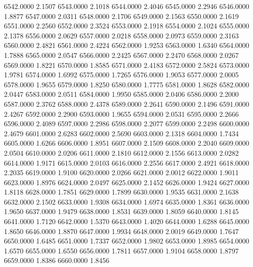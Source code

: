 6542.0000      2.1507
6543.0000      2.1018
6544.0000      2.4046
6545.0000      2.2946
6546.0000      1.8877
6547.0000      2.0311
6548.0000      2.1706
6549.0000      2.1563
6550.0000      2.1619
6551.0000      2.2560
6552.0000      2.3524
6553.0000      2.1918
6554.0000      2.1024
6555.0000      2.1378
6556.0000      2.0629
6557.0000      2.0218
6558.0000      2.0973
6559.0000      2.3163
6560.0000      2.4821
6561.0000      2.4224
6562.0000      1.9253
6563.0000      1.6340
6564.0000      1.7888
6565.0000      2.0547
6566.0000      2.2425
6567.0000      2.2470
6568.0000      2.0267
6569.0000      1.8221
6570.0000      1.8585
6571.0000      2.4183
6572.0000      2.5824
6573.0000      1.9781
6574.0000      1.6992
6575.0000      1.7265
6576.0000      1.9053
6577.0000      2.0005
6578.0000      1.9655
6579.0000      1.8250
6580.0000      1.7775
6581.0000      1.8628
6582.0000      2.0447
6583.0000      2.0511
6584.0000      1.9950
6585.0000      2.0406
6586.0000      2.2000
6587.0000      2.3762
6588.0000      2.4378
6589.0000      2.2641
6590.0000      2.1496
6591.0000      2.4267
6592.0000      2.2900
6593.0000      1.9655
6594.0000      2.0531
6595.0000      2.2666
6596.0000      2.4089
6597.0000      2.2986
6598.0000      2.2077
6599.0000      2.2498
6600.0000      2.4679
6601.0000      2.6283
6602.0000      2.5690
6603.0000      2.1318
6604.0000      1.7434
6605.0000      1.6266
6606.0000      1.8951
6607.0000      2.1509
6608.0000      2.2040
6609.0000      2.0504
6610.0000      2.0206
6611.0000      2.1810
6612.0000      2.1556
6613.0000      2.0282
6614.0000      1.9171
6615.0000      2.0103
6616.0000      2.2556
6617.0000      2.4921
6618.0000      2.2035
6619.0000      1.9100
6620.0000      2.0266
6621.0000      2.0012
6622.0000      1.9011
6623.0000      1.8976
6624.0000      2.0497
6625.0000      2.1452
6626.0000      1.9424
6627.0000      1.8118
6628.0000      1.7851
6629.0000      1.7899
6630.0000      1.9535
6631.0000      2.1638
6632.0000      2.1502
6633.0000      1.9308
6634.0000      1.6974
6635.0000      1.8361
6636.0000      1.9650
6637.0000      1.9479
6638.0000      1.8531
6639.0000      1.8059
6640.0000      1.8145
6641.0000      1.7120
6642.0000      1.5370
6643.0000      1.4020
6644.0000      1.6288
6645.0000      1.8650
6646.0000      1.8870
6647.0000      1.9934
6648.0000      2.0019
6649.0000      1.7647
6650.0000      1.6485
6651.0000      1.7337
6652.0000      1.9802
6653.0000      1.8985
6654.0000      1.6570
6655.0000      1.6550
6656.0000      1.7811
6657.0000      1.9104
6658.0000      1.8797
6659.0000      1.8386
6660.0000      1.8456
